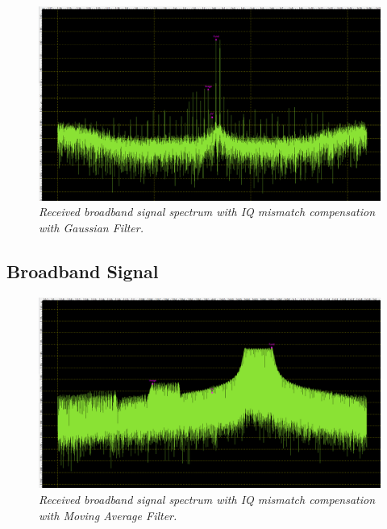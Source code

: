 \documentclass[en,printmode]{mgr}
\begin{document}
   		\begin{figure}[!htb]
    		\centering
   			\includegraphics[width=\textwidth]{plots/my_multi_gauss.png}
   		 	\caption{\textit{Received broadband signal spectrum with IQ mismatch compensation with
   		 	Gaussian Filter.}}
   		\end{figure}		
		\subsection*{Broadband Signal}	
		\begin{figure}[!htb]
    		\centering
   			\includegraphics[width=\textwidth]{plots/my_band_mav.png}
   		 	\caption{\textit{Received broadband signal spectrum with IQ mismatch compensation with
   		 	Moving Average Filter.}}
   		\end{figure}
   		
\end{document}
